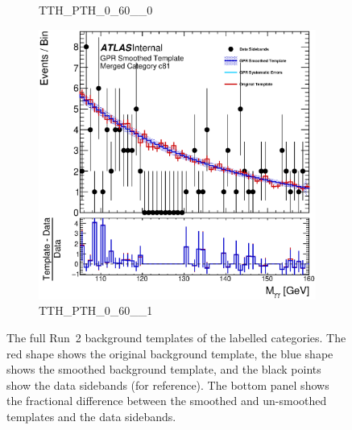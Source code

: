 \begin{figure}
\begin{center}
\begin{subfigure}[T]{0.49\linewidth}
	\caption{TTH\_PTH\_0\_60\_\_0}
\end{subfigure}
\begin{subfigure}[T]{0.49\linewidth}
	\centering
	\includegraphics[width=\linewidth]{figures/background/gpr/coupCatTemplates/GPR_Smoothed_Plot_hmgg_c81.eps}
	\caption{TTH\_PTH\_0\_60\_\_1}
\end{subfigure}
\caption{The full Run~2 background templates of the labelled categories. The red shape shows the original background template, the blue shape shows the smoothed background template, and the black points show the data sidebands (for reference). The bottom panel shows the fractional difference between the smoothed and un-smoothed templates and the data sidebands. }
 \label{fig:gpr_coupcat_20}
 \end{center}
\end{figure}

